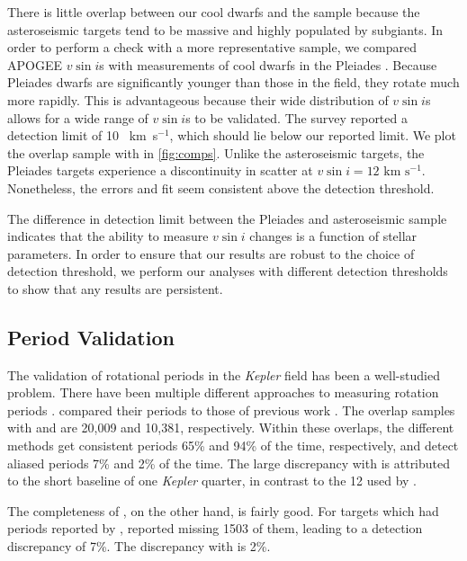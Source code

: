 \documentclass[manuscript]{aastex6}
\newcommand{\vsini}{\ensuremath{v \sin i}}
\newcommand{\Kepler}{\mbox{\textit{Kepler}}}
\newcommand{\kms}{\textrm{~km~s}\ensuremath{^{-1}}}
\begin{document}
There is little overlap between our cool dwarfs and the 
\citet{Bruntt12} sample because the asteroseismic targets tend to be massive and 
highly populated by subgiants. In order to perform a check with a more
representative sample, we compared APOGEE \vsini{}s with  
measurements of cool dwarfs in the Pleiades \citep{Stauffer87}. Because
Pleiades dwarfs are significantly younger than those in the field,
they rotate much more rapidly. This is advantageous because their 
wide distribution of \vsini{}s allows for a wide range of \vsini{}s to be 
validated. The \citet{Stauffer87} survey reported a detection limit of
10 \kms, which should lie below our reported limit. We plot the overlap 
sample with \citet{Stauffer87} in \cref{fig:comps}.  Unlike the asteroseismic 
targets, the Pleiades targets experience a discontinuity in scatter at 
\(\vsini = 12 \kms\).  Nonetheless, the errors and fit seem consistent above 
the detection threshold.

The difference in detection limit between the Pleiades and asteroseismic sample
indicates that the ability to measure \vsini{} changes is a function of stellar
parameters. In order to ensure that our results are robust to the choice of
detection threshold, we
perform our analyses with different detection thresholds to show that any
results are persistent.

\subsection{Period Validation}

The validation of rotational periods in the \Kepler{} field has been a
well-studied problem. There have been multiple different approaches to
measuring rotation periods \citep{Reinhold13,Nielsen13,McQuillan14,Garcia14}.
\citet{McQuillan14} compared their periods to those of previous work
\citep{Reinhold13,Nielsen13}. The overlap samples with
\citet{Reinhold13} and \citet{Nielsen13} are 20,009 and 10,381,
respectively. Within these overlaps, the different methods get
consistent periods 65\% and 94\% of the time, respectively, and detect
aliased periods 7\% and 2\% of the time. The large discrepancy with
\citet{Reinhold13} is attributed to the short baseline of one \Kepler
quarter, in contrast to the 12 used by \citet{McQuillan14}.

The completeness of \citet{McQuillan14}, on the other hand, is fairly
good. For targets which had periods reported by \citet{Reinhold13},
\citet{McQuillan14} reported missing 1503 of them, leading to a detection
discrepancy of 7\%. The discrepancy with \citet{Nielsen13} is 2\%.
\end{document}
